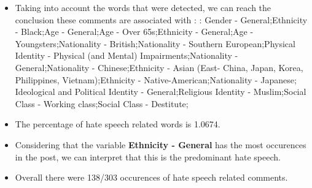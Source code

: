 \documentclass[11pt]{article}
\begin{document}
\begin{itemize}\item Taking into account the words that were detected, we can reach the conclusion these comments are associated with : : Gender - General;Ethnicity - Black;Age - General;Age - Over 65s;Ethnicity - General;Age - Youngsters;Nationality - British;Nationality - Southern European;Physical Identity - Physical (and Mental) Impairments;Nationality - General;Nationality - Chinese;Ethnicity - Asian (East- China, Japan, Korea, Philippines, Vietnam);Ethnicity - Native-American;Nationality - Japanese; Ideological and Political Identity - General;Religious Identity - Muslim;Social Class - Working class;Social Class - Destitute;%

\item The percentage of hate speech related words is 1.0674.

\item Considering that the variable \textbf{Ethnicity - General} has the most occurences in the post, we can interpret that this is the predominant hate speech.

\item Overall there were 138/303 occurences of hate speech related comments.\end{itemize}
\end{document}

